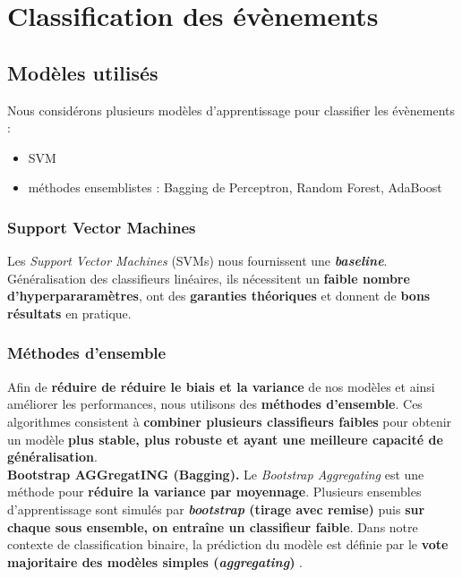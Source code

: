 \documentclass[12pt]{article}
\begin{document}
\section{Classification des évènements}

\subsection{Modèles utilisés}

Nous considérons plusieurs modèles d'apprentissage pour classifier les
évènements :

\begin{itemize}
    \item SVM
    \item méthodes ensemblistes : Bagging de Perceptron, Random Forest, AdaBoost
\end{itemize}

\subsubsection{Support Vector Machines}

Les \emph{Support Vector Machines} (SVMs) nous fournissent une
\textbf{\emph{baseline}}. Généralisation des classifieurs linéaires, ils
nécessitent un \textbf{faible nombre d'hyperpararamètres}, ont des
\textbf{garanties théoriques} et donnent de \textbf{bons résultats} en pratique.

\subsubsection{Méthodes d'ensemble}

Afin de \textbf{réduire de réduire le biais et la variance} de nos modèles et
ainsi améliorer les performances, nous utilisons des \textbf{méthodes
d'ensemble}. Ces algorithmes consistent à \textbf{combiner plusieurs classifieurs
faibles} pour obtenir un modèle \textbf{plus stable, plus robuste et ayant une meilleure
capacité de généralisation}. \\

\textbf{Bootstrap AGGregatING (Bagging). } \quad Le \emph{Bootstrap Aggregating}
est une méthode pour \textbf{réduire la variance par moyennage}.  Plusieurs
ensembles d'apprentissage sont simulés par \textbf{\emph{bootstrap} (tirage avec
remise)} puis \textbf{sur chaque sous ensemble, on entraîne un classifieur
faible}.  Dans notre contexte de classification binaire, la prédiction du modèle
est définie par le \textbf{vote majoritaire des modèles simples
(\emph{aggregating})} .
\end{document}

